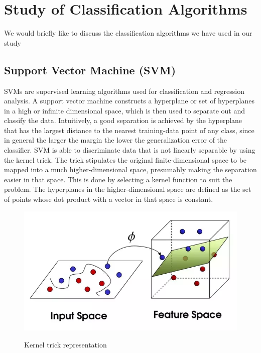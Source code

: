 \chapter{Study of Classification Algorithms} \label{Study of Classification Algorithms}
We would briefly like to discuss the classification algorithms we have used in our study


\section{ Support Vector Machine (SVM)} \label{ Support Vector Machine (SVM)}
\noindent SVMs are supervised learning algorithms used for classification and regression analysis. A support vector machine constructs a hyperplane or set of hyperplanes in a high or infinite dimensional space, which is then used to separate out and classify the data. Intuitively, a good separation is achieved by the hyperplane that has the largest distance to the nearest training-data point of any class, since in general the larger the margin the lower the generalization error of the classifier. SVM is able to discriminate data that is not linearly separable by using the kernel trick. 
\noindent The trick stipulates the original finite-dimensional space to be mapped into a much higher-dimensional space, presumably making the separation easier in that space. This is done by selecting a kernel function to suit the problem. The hyperplanes in the higher-dimensional space are defined as the set of points whose dot product with a vector in that space is constant.

\begin{figure}[H]
\centering
{\includegraphics[scale=0.65]{ktr.png}}
\caption{Kernel trick representation}
\end{figure}


